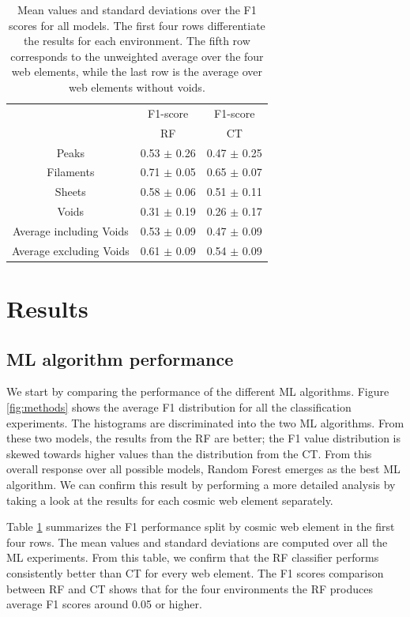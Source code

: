 \documentclass[usenatbib]{mnras}
\begin{document}
\begin{table}
\centering
\begin{tabular}{ccc}
\hline
    & F1-score & F1-score              \\
     & RF              & CT              \\
\hline
 Peaks              & 0.53 $\pm$ 0.26 & 0.47 $\pm$ 0.25 \\
 Filaments          & 0.71 $\pm$ 0.05 & 0.65 $\pm$ 0.07 \\
 Sheets            & 0.58 $\pm$ 0.06 & 0.51 $\pm$ 0.11 \\
 Voids               & 0.31 $\pm$ 0.19 & 0.26 $\pm$ 0.17 \\
 Average including Voids    & 0.53 $\pm$ 0.09 & 0.47 $\pm$ 0.09 \\
 Average excluding Voids & 0.61 $\pm$ 0.09 & 0.54 $\pm$ 0.09 \\
\hline
\end{tabular}
\caption{Mean values and standard deviations 
  over the F1 scores for all models.
  The first four rows differentiate the results for each environment.
  The fifth row corresponds to the unweighted average over the four web elements, while the last row is the average over web elements without voids.}
\label{table:elements}
\end{table}


\section{Results}\label{sec:results}

\subsection{ML algorithm performance}

We start by comparing the performance of the different ML algorithms.
Figure \ref{fig:methods} shows the average F1 distribution for
all the classification experiments.
The histograms are discriminated into the two ML algorithms.
From these two models, the results from the RF are better; the F1 value distribution is skewed towards higher values than the distribution from the CT.
From this overall response over all possible models, Random Forest
emerges as the best ML algorithm.
We can confirm this result by performing a more detailed analysis by
taking a look at the results for each cosmic web element separately.

Table \ref{table:elements} summarizes the F1 performance split by cosmic
web element in the first four rows.
The mean values and standard deviations are computed over all the ML experiments. 
From this table, we confirm that the RF classifier performs
consistently better than CT for every web element.
The F1 scores comparison between RF and CT shows that for the four environments the RF produces average F1 scores around 0.05 or higher. 
\end{document}

